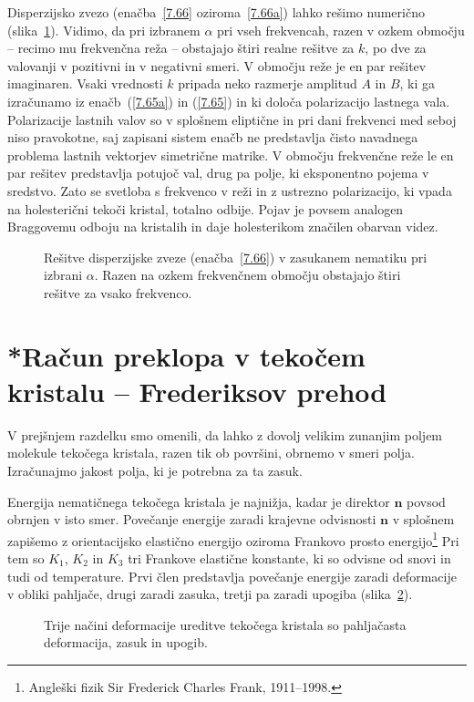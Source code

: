 \begin{remark}
Disperzijsko zvezo (enačba~\ref{7.66} oziroma~\ref{7.66a}) 
lahko rešimo numerično (slika~\ref{gap}). Vidimo, da pri 
izbranem $\alpha$ pri vseh frekvencah, razen v ozkem območju -- recimo mu frekvenčna reža --
obstajajo štiri realne rešitve za $k$, 
po dve za valovanji v pozitivni in v negativni smeri.
V območju reže je en par rešitev imaginaren. Vsaki vrednosti $k$
pripada neko razmerje amplitud $A$ in $B$, ki ga izračunamo
iz enačb~(\ref{7.65a}) in (\ref{7.65}) in ki določa polarizacijo lastnega vala. Polarizacije
lastnih valov so v splošnem eliptične in pri dani frekvenci med
seboj niso pravokotne, saj zapisani sistem enačb ne predstavlja čisto 
navadnega problema lastnih vektorjev simetrične matrike. 
V območju frekvenčne reže le en par rešitev predstavlja
potujoč val, drug pa polje, ki eksponentno pojema v sredstvo. Zato
se svetloba s frekvenco v reži in z ustrezno polarizacijo, ki vpada
na holesterični tekoči kristal, totalno odbije. Pojav je povsem analogen
Braggovemu odboju na kristalih in daje holesterikom značilen obarvan
videz.
\begin{figure}[h]
\centering
\def\svgwidth{80truemm} 

\caption{Rešitve disperzijske zveze (enačba~\ref{7.66}) v zasukanem nematiku
pri izbrani $\alpha$. Razen na ozkem frekvenčnem območju obstajajo štiri 
rešitve za vsako frekvenco.}
\label{gap}
\end{figure}
\end{remark}

\section{*Račun preklopa v tekočem kristalu -- Frederiksov prehod}
V prejšnjem razdelku smo omenili, da lahko z dovolj velikim zunanjim poljem 
molekule tekočega kristala, razen tik ob površini, obrnemo v smeri polja. 
Izračunajmo jakost polja, ki je potrebna za ta zasuk. 

Energija nematičnega tekočega kristala je najnižja, kadar je direktor $\mathbf{n}$
povsod obrnjen v isto smer. Povečanje energije zaradi krajevne odvisnosti $\mathbf{n}$
v splošnem zapišemo z orientacijsko elastično energijo oziroma Frankovo prosto 
energijo\footnote{Angleški fizik Sir Frederick Charles Frank, 1911--1998.}
Pri tem so $K_{1}$, $K_{2}$ in $K_{3}$ tri Frankove elastične
konstante, ki so odvisne od snovi in tudi od temperature. 
Prvi člen predstavlja povečanje energije zaradi deformacije v obliki 
pahljače, drugi zaradi zasuka, tretji pa zaradi upogiba (slika~\ref{s7.20}).
\begin{figure}[h]
\centering
\def\svgwidth{140truemm} 

\caption{Trije načini deformacije ureditve tekočega kristala so pahljačasta deformacija,
zasuk in upogib.}
\label{s7.20}
\end{figure}

